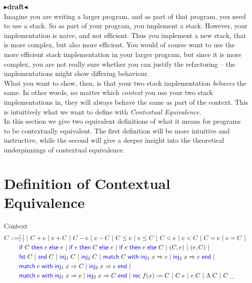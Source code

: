 \documentclass[twoside,11pt,openright]{report}
\theoremstyle{definition}
\newcommand{\BNFdef}{::=}
\newcommand{\ALT}{~|~}
\newcommand{\Keyword}[1]{{\color{blue} \mathsf{#1}}}
\newcommand{\var}{x}
\newcommand{\expr}{e}
\newcommand{\IfCmd}{\Keyword{if}}
\newcommand{\ThenCmd}{\Keyword{then}}
\newcommand{\ElseCmd}{\Keyword{else}}
\def\If#1then#2else#3{\IfCmd{}\;#1\;\ThenCmd{}\;#2\;\ElseCmd{}\;#3}
\newcommand{\Fst}{\Keyword{fst}\;}
\newcommand{\Snd}{\Keyword{snd}\;}
\newcommand{\Inj}[1]{\Keyword{inj}_{#1}\;}
\newcommand{\MatchCmd}{\Keyword{match}}
\newcommand{\WithCmd}{\Keyword{with}}
\newcommand{\EndCmd}{\Keyword{end}}
\def\Match#1with#2=>#3|#4=>#5end{\MatchCmd{}\;#1\;\WithCmd{}\;#2\Rightarrow#3 \;|\;#4\Rightarrow#5\;\EndCmd{}}
\newcommand{\Tlam}{\Lambda\;}
\newcommand{\Tapp}[1]{#1\;\_}
\newcommand{\empctx}{[\cdot]}
\newcommand{\ctx}{C}
\newcommand{\todo}[1]{{\color[rgb]{.5,0,0}\textbf{$\blacktriangleright$#1$\blacktriangleleft$}}}
\begin{document}
\todo{draft}\\
Imagine you are writing a larger program, and as part of that program, you need to use a stack. So as part of your program, you implement a stack. However, your implementation is naive, and not efficient. Thus you implement a new stack, that is more complex, but also more efficient. You would of course want to use the more efficient stack implementation in your larger program, but since it is more complex, you are not really sure whether you can justify the refactoring – the implementations might show differing behaviour.\\
What you want to show, then, is that your two stack implementation \textit{behaves} the same. In other words, no matter which \textit{context} you use your two stack implementations in, they will always behave the same as part of the context. This is intuitively what we want to define with \textit{Contextual Equivalence}.\\
In this section we give two equivalent definitions of what it means for programs to be contextually equivalent. The first definition will be more intuitive and instructive, while the second will give a deeper insight into the theoretical underpinnings of contextual equivalence.

\section{Definition of Contextual Equivalence}
Context
\begin{align*}
  \ctx \BNFdef& \empctx \ALT
                \ctx + \expr \ALT \expr + \ctx \ALT
                \ctx - \expr \ALT \expr - \ctx \ALT
                \ctx \le \expr \ALT \expr \le \ctx \ALT
                \ctx < \expr \ALT \expr < \ctx \ALT
                \ctx = \expr \ALT \expr = \ctx \ALT\\
              & {\If \ctx then \expr else \expr} \ALT
                {\If \expr then \ctx else \expr} \ALT
                {\If \expr then \expr else \ctx} \ALT
                (\ctx, \expr) \ALT (\expr, \ctx) \ALT\\
              & \Fst \ctx \ALT \Snd \ctx \ALT
                \Inj{1} \ctx \ALT \Inj{2} \ctx \ALT
                \Match \ctx with \Inj{1} \var => \expr | \Inj{2} \var => \expr end \ALT\\
              & \Match \expr with \Inj{1} \var => \ctx | \Inj{2} \var => \expr end \ALT\\
              & \Match \expr with \Inj{1} \var => \expr | \Inj{2} \var => \ctx end \ALT
              \Rec f \var := \ctx \ALT
              \ctx \; \expr \ALT \expr \; \ctx \ALT \Tlam \ctx \ALT \Tapp{\ctx}
\end{align*}
\end{document}
